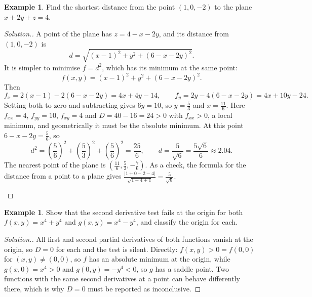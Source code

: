 \documentclass[11pt,a4paper]{article}
\theoremstyle{definition}
\newtheorem{exa}[thm]{Example}
\newenvironment{solution}
  {\renewcommand{\qedsymbol}{}\begin{proof}[\textit{Solution}.]}
  {\end{proof}}
\begin{document}
\begin{exa}
\label{ex:distanceplane}
Find the shortest distance from the point $(1,0,-2)$ to the plane
$x + 2y + z = 4$.
\end{exa}

\begin{solution}
A point of the plane has $z = 4 - x - 2y$, and its distance from $(1,0,-2)$ is
\[d = \sqrt{(x-1)^2 + y^2 + (6-x-2y)^2} .\]
It is simpler to minimise $f = d^2$, which has its minimum at the same point:
\[f(x,y) = (x-1)^2 + y^2 + (6-x-2y)^2 .\]
Then
\[f_x = 2(x -1) -2(6 - x -2y) = 4x + 4y - 14,\qquad f_y = 2y - 4(6 - x - 2y) =
4x + 10y - 24 .\]
Setting both to zero and subtracting gives $6y = 10$, so $y = \frac53$ and
$x = \frac{11}{6}$. Here $f_{xx} = 4$, $f_{yy} = 10$, $f_{xy} = 4$ and
$D = 40 - 16 = 24 >0$ with $f_{xx}>0$, a local minimum, and geometrically it must
be the absolute minimum. At this point $6 - x - 2y = \frac56$, so
\[d^2 = \left(\frac56\right)^2 + \left(\frac53\right)^2 + \left(\frac56\right)^2 =
\frac{25}{6},\qquad d = \frac{5}{\sqrt6} = \frac{5\sqrt6}{6}\approx 2.04 .\]
The nearest point of the plane is $\left(\frac{11}{6},\frac53,-\frac76\right)$.
As a check, the formula for the distance from a point to a plane gives
$\frac{|1 + 0 - 2 - 4|}{\sqrt{1+4+1}} = \frac{5}{\sqrt 6}$.

\begin{figure}[H]
\centering
{}
\end{figure}
\end{solution}

\begin{exa}
\label{ex:degenerate}
Show that the second derivative test fails at the origin for both
$f(x,y) = x^4 + y^4$ and $g(x,y) = x^4 - y^4$, and classify the origin for each.
\end{exa}

\begin{solution}
All first and second partial derivatives of both functions vanish at the origin,
so $D = 0$ for each and the test is silent. Directly: $f(x,y)>0 = f(0,0)$ for
$(x,y)\neq(0,0)$, so $f$ has an absolute minimum at the origin, while
$g(x,0) = x^4>0$ and $g(0,y) = -y^4<0$, so $g$ has a saddle point. Two functions
with the same second derivatives at a point can behave differently there, which
is why $D = 0$ must be reported as inconclusive.
\end{solution}
\end{document}
